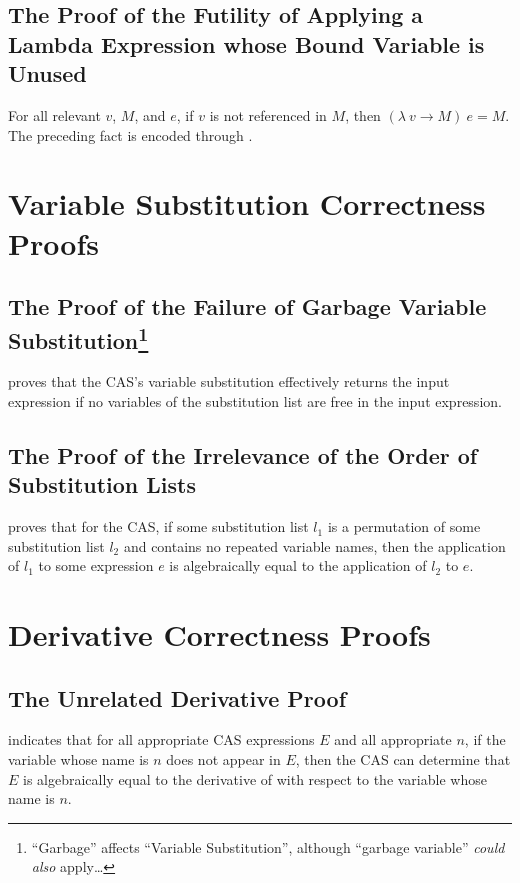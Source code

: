 \documentclass{report}
\begin{document}
\subsection{The Proof of the Futility of Applying a Lambda Expression whose Bound Variable is Unused}
For all relevant \(v\), \(M\), and \(e\), if \(v\) is not referenced in \(M\), then \(\left(\lambda\ v \rightarrow M\right)\ e = M\).  The preceding fact is encoded through .

\section{Variable Substitution Correctness Proofs}

\subsection{The Proof of the Failure of Garbage Variable Substitution\footnote{``Garbage'' affects ``Variable Substitution'', although ``garbage variable'' \emph{could} \emph{also} apply\ldots\label{fn:garbageVariable}}}
  proves that the  CAS's variable substitution effectively returns the input expression if no variables of the substitution list are free in the input expression.

\subsection{The Proof of the Irrelevance of the Order of Substitution Lists}
  proves that for the  CAS, if some substitution list \(l_1\) is a permutation of some substitution list \(l_2\) and contains no repeated variable names, then the application of \(l_1\) to some expression \(e\) is algebraically equal to the application of \(l_2\) to \(e\).

\section{Derivative Correctness Proofs}

\subsection{The Unrelated Derivative Proof}
  indicates that for all appropriate  CAS expressions \(E\) and all appropriate \(n\), if the variable whose name is \(n\) does not appear in \(E\), then the  CAS can determine that \(E\) is algebraically equal to the derivative of  with respect to the variable whose name is \(n\).
\end{document}
